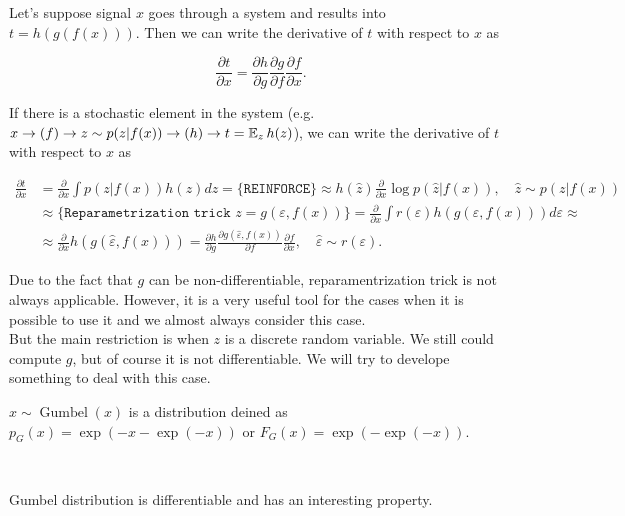 Let's suppose signal $x$ goes through a system and results into $t = h(g(f(x)))$. Then we can write the derivative of $t$ with respect to $x$ as

\begin{equation*}
    \frac{\partial t}{\partial x} = \frac{\partial h}{\partial g} \frac{\partial g}{\partial f} \frac{\partial f}{\partial x}.
\end{equation*}

If there is a stochastic element in the system (e.g. $x \to (f) \to z \sim p(z | f(x)) \to (h) \to t = \operatorname{\mathbb{E}}_{z} h(z)$), we can write the derivative of $t$ with respect to $x$ as

\begin{equation*}
    \begin{aligned}
        \frac{\partial t}{\partial x} &= \frac{\partial}{\partial x} \int p(z | f(x)) h(z) dz =\{\texttt{REINFORCE}\} \approx h(\widehat{z}) \frac{\partial}{\partial x} \log p(\widehat{z} | f(x)), \quad \widehat{z} \sim p(z | f(x)) \\ 
        &\approx \{\texttt{Reparametrization trick } z = g(\varepsilon, f(x))\} = \frac{\partial}{\partial x} \int r(\varepsilon) h(g(\varepsilon, f(x))) d\varepsilon \approx \\
        &\approx \frac{\partial}{\partial x} h(g(\widehat{\varepsilon}, f(x))) = \frac{\partial h}{\partial g} \frac{\partial g(\widehat{\varepsilon}, f(x))}{\partial f} \frac{\partial f}{\partial x}, \quad \widehat{\varepsilon} \sim r(\varepsilon).
    \end{aligned}
\end{equation*}

Due to the fact that $g$ can be non-differentiable, reparamentrization trick is not always applicable. However, it is a very useful tool for the cases when it is possible to use it and we almost always consider this case. \\ 

But the main restriction is when $z$ is a discrete random variable. We still could compute $g$, but of course it is not differentiable. We will try to develope something to deal with this case.

\begin{edefn}
    $x \sim \operatorname{Gumbel}(x)$ is a distribution deined as $p_G(x) = \exp(-x - \exp(-x))$ or $F_G(x) = \exp(-\exp(-x))$.
\end{edefn} \ 

Gumbel distribution is differentiable and has an interesting property. \\

